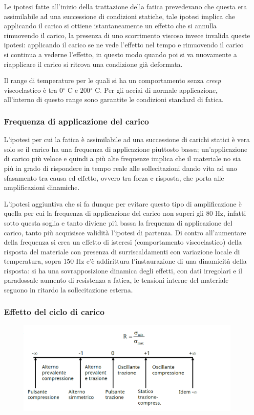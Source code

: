			 Le ipotesi fatte all'inizio della trattazione della fatica prevedevano che questa era assimilabile ad una successione di condizioni statiche, tale ipotesi implica che applicando il carico si ottiene istantaneamente un effetto che si annulla rimuovendo il carico, la presenza di uno scorrimento viscoso invece invalida queste ipotesi: applicando il carico se ne vede l'effetto nel tempo e rimuovendo il carico si continua a vederne l'effetto, in questo modo quando poi si va nuovamente a riapplicare il carico si ritrova una condizione già deformata. \newline 
			 
			 Il range di temperature per le quali si ha un comportamento senza \textit{creep} viscoelastico è tra 0$^\circ$ C e 200$^\circ$ C. Per gli acciai di normale applicazione, all'interno di questo range sono garantite le condizioni standard di fatica. \newpage
			 
\subsubsection{Frequenza di applicazione del carico}
			 L'ipotesi per cui la fatica è assimilabile ad una successione di carichi statici è vera solo se il carico ha una frequenza di applicazione piuttosto bassa; un'applicazione di carico più veloce e quindi a più alte frequenze implica che il materiale no sia più in grado di rispondere in tempo reale alle sollecitazioni dando vita ad uno sfasamento tra causa ed effetto, ovvero tra forza e risposta, che porta alle amplificazioni dinamiche. \newline 
			 
			 L'ipotesi aggiuntiva che si fa dunque per evitare questo tipo di amplificazione è quella per cui la frequenza di applicazione del carico non superi gli $80$ Hz, infatti sotto questa soglia e tanto diviene più bassa la frequenza di applicazione del carico, tanto più acquisisce validità l'ipotesi di partenza. Di contro all'aumentare della frequenza si crea un effetto di isteresi (comportamento viscoelastico) della risposta del materiale con presenza di surriscaldamenti con variazione locale di temperatura, sopra 150 Hz c'è addirittura l'instaurazione di una dinamicità della risposta: si ha una sovrapposizione dinamica degli effetti, con dati irregolari e il paradossale aumento di resistenza a fatica, le tensioni interne del materiale seguono in ritardo la sollecitazione esterna. 
			 
\subsubsection{Effetto del ciclo di carico}
			\begin{figure}[H]
				\centering
				\includegraphics[width=0.5\linewidth]{immagini_10/screenshot030}
				\label{fig:screenshot030}
			\end{figure}			
			 

